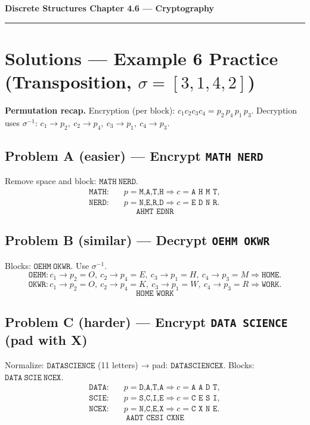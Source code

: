 \documentclass[12pt]{article}
\begin{document}
{\large \textbf{Discrete Structures \quad Chapter 4.6 — Cryptography}}

\hrule
\vspace{0.6em}

\section*{Solutions — Example 6 Practice (Transposition, $\sigma=[3,1,4,2]$)}

\textbf{Permutation recap.} Encryption (per block): \(c_1c_2c_3c_4 = p_2\,p_4\,p_1\,p_3\).  
Decryption uses \(\sigma^{-1}\): \(c_1 \to p_2,\ c_2 \to p_4,\ c_3 \to p_1,\ c_4 \to p_3.\)

\subsection*{Problem A (easier) — Encrypt \texttt{MATH NERD}}
Remove space and block: \(\texttt{MATH}\ \texttt{NERD}\).
\[
\begin{aligned}
\texttt{MATH}:&\quad p=\texttt{M,A,T,H} \Rightarrow c=\texttt{A H M T},\\
\texttt{NERD}:&\quad p=\texttt{N,E,R,D} \Rightarrow c=\texttt{E D N R}.
\end{aligned}
\]
\[
\boxed{\texttt{AHMT EDNR}}
\]

\subsection*{Problem B (similar) — Decrypt \texttt{OEHM OKWR}}
Blocks: \(\texttt{OEHM}\ \texttt{OKWR}\). Use \(\sigma^{-1}\).
\[
\texttt{OEHM}: c_1 \to p_2=O,\ c_2 \to p_4=E,\ c_3 \to p_1=H,\ c_4 \to p_3=M
\Rightarrow \texttt{HOME}.
\]
\[
\texttt{OKWR}: c_1 \to p_2=O,\ c_2 \to p_4=K,\ c_3 \to p_1=W,\ c_4 \to p_3=R
\Rightarrow \texttt{WORK}.
\]
\[
\boxed{\texttt{HOME WORK}}
\]

\subsection*{Problem C (harder) — Encrypt \texttt{DATA SCIENCE} (pad with X)}
Normalize: \(\texttt{DATASCIENCE}\) (11 letters) → pad: \(\texttt{DATASCIENCEX}\).  
Blocks: \(\texttt{DATA}\ \texttt{SCIE}\ \texttt{NCEX}\).
\[
\begin{aligned}
\texttt{DATA}:&\quad p=\texttt{D,A,T,A} \Rightarrow c=\texttt{A A D T},\\
\texttt{SCIE}:&\quad p=\texttt{S,C,I,E} \Rightarrow c=\texttt{C E S I},\\
\texttt{NCEX}:&\quad p=\texttt{N,C,E,X} \Rightarrow c=\texttt{C X N E}.
\end{aligned}
\]
\[
\boxed{\texttt{AADT CESI CXNE}}
\]
\end{document}
